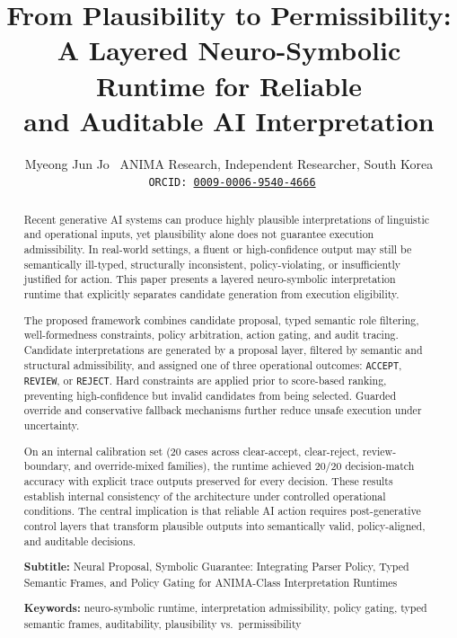 \documentclass[11pt,a4paper]{article}
\title{%
  \textbf{From Plausibility to Permissibility:\\
  A Layered Neuro-Symbolic Runtime for Reliable\\
  and Auditable AI Interpretation}
}
\author{%
  Myeong Jun Jo \
  ANIMA Research, Independent Researcher, South Korea \
  \texttt{ORCID: \href{https://orcid.org/0009-0006-9540-4666}{0009-0006-9540-4666}}
}
\date{}
\begin{document}
\maketitle

\begin{abstract}
Recent generative AI systems can produce highly plausible interpretations of linguistic and operational inputs, yet plausibility alone does not guarantee execution admissibility. In real-world settings, a fluent or high-confidence output may still be semantically ill-typed, structurally inconsistent, policy-violating, or insufficiently justified for action. This paper presents a layered neuro-symbolic interpretation runtime that explicitly separates candidate generation from execution eligibility.

The proposed framework combines candidate proposal, typed semantic role filtering, well-formedness constraints, policy arbitration, action gating, and audit tracing. Candidate interpretations are generated by a proposal layer, filtered by semantic and structural admissibility, and assigned one of three operational outcomes: \texttt{ACCEPT}, \texttt{REVIEW}, or \texttt{REJECT}. Hard constraints are applied prior to score-based ranking, preventing high-confidence but invalid candidates from being selected. Guarded override and conservative fallback mechanisms further reduce unsafe execution under uncertainty.

On an internal calibration set (20 cases across clear-accept, clear-reject, review-boundary, and override-mixed families), the runtime achieved 20/20 decision-match accuracy with explicit trace outputs preserved for every decision. These results establish internal consistency of the architecture under controlled operational conditions. The central implication is that reliable AI action requires post-generative control layers that transform plausible outputs into semantically valid, policy-aligned, and auditable decisions.

\vspace{6pt}
\noindent\textbf{Subtitle:} Neural Proposal, Symbolic Guarantee: Integrating Parser Policy, Typed Semantic Frames, and Policy Gating for ANIMA-Class Interpretation Runtimes

\vspace{6pt}
\noindent\textbf{Keywords:} neuro-symbolic runtime, interpretation admissibility, policy gating, typed semantic frames, auditability, plausibility vs.\ permissibility
\end{abstract}
\end{document}

